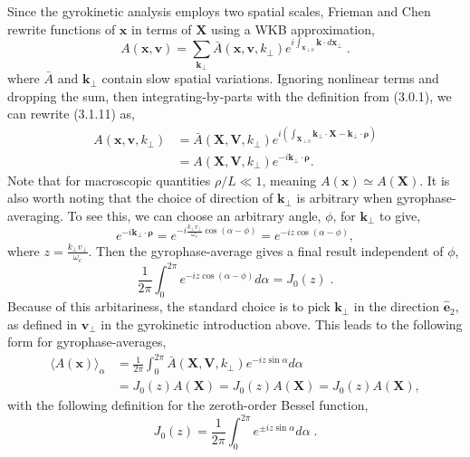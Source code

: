 \documentclass[12pt]{article}
\numberwithin{equation}{subsection}
\begin{document}
   \quad Since the gyrokinetic analysis employs two spatial scales, Frieman and Chen rewrite functions of $\bm{x}$ in terms of $\bm{X}$ using
a WKB approximation\cite{FriemanChen},
   \begin{equation}
      A(\bm{x}, \bm{v}) = \sum\limits_{\bm{k}_\perp}\bar{A}(\bm{x},\bm{v},k_\perp)e^{i\int_{\bm{x}_{\perp 0}}\bm{k}\cdot d\bm{x}_\perp}\;.
   \end{equation}
where $\bar{A}$ and $\bm{k}_\perp$ contain slow spatial variations. Ignoring nonlinear terms and dropping the sum, then integrating-by-parts
with the definition from (3.0.1), we can rewrite (3.1.11) as\cite{FriemanChen},
   \begin{equation}
   \begin{aligned}
      A(\bm{x}, \bm{v}, k_\perp) &= \bar{A}(\bm{X},\bm{V},k_\perp)e^{i(\int_{\bm{X}_{\perp 0}}\bm{k}_\perp\cdot\bm{X} - \bm{k}_\perp\cdot\bm{\rho})} \\
                                 &= A(\bm{X},\bm{V},k_\perp)e^{-i \bm{k}_\perp\cdot\bm{\rho}}.
   \end{aligned}                              
   \end{equation}
Note that for macroscopic quantities $\rho/L \ll 1$, meaning $A(\bm{x}) \simeq A(\bm{X})$.  It is also worth noting that the choice of direction of
$\bm{k}_\perp$ is arbitrary when gyrophase-averaging. To see this, we can choose an arbitrary angle, $\phi$, for $\bm{k}_\perp$ to give,
   \begin{equation}
      e^{-i\bm{k}_\perp\cdot\bm{\rho}} = e^{-i\frac{k_\perp v_\perp}{\omega_c}\cos(\alpha - \phi)} = e^{-iz\cos(\alpha-\phi)},
   \end{equation}
where $z = \frac{k_\perp v_\perp}{\omega_c}$. Then the gyrophase-average gives a final result independent of $\phi$,
   \begin{equation}
      \frac{1}{2\pi}\int_{0}^{2\pi}e^{-iz\cos(\alpha-\phi)}d\alpha = J_0(z)\;.
   \end{equation}
Because of this arbitariness, the standard choice is to pick $\bm{k}_\perp$ in the direction $\bm{\hat{e}}_2$, as defined in
$\bm{v}_\perp$ in the gyrokinetic introduction above. This leads to the following form
for gyrophase-averages,
   \begin{equation}
   \begin{aligned}
      \langle A(\bm{x})\rangle_\alpha &= \frac{1}{2\pi}\int_{0}^{2\pi}\bar{A}(\bm{X},\bm{V},k_\perp)e^{-iz\sin\alpha} d\alpha \\
                                      &= J_0(z) A(\bm{X}) = J_0(z)A(\bm{X}) = J_0(z)A(\bm{X}),
   \end{aligned}
   \end{equation}
with the following definition for the zeroth-order Bessel function,
   \begin{equation}
      J_0(z) = \frac{1}{2\pi}\int_{0}^{2\pi}e^{\pm iz\sin\alpha}d\alpha\;.
   \end{equation}
\end{document}
